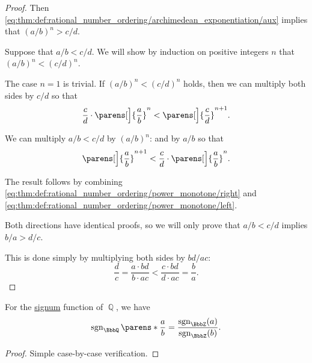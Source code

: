 \begin{proof}
  Then \eqref{eq:thm:def:rational_number_ordering/archimedean_exponentiation/aux} implies that \( (a / b)^n > c / d \).

   Suppose that \( a / b < c / d \). We will show by induction on positive integers \( n \) that \( (a / b)^n < (c / d)^n \).

  The case \( n = 1 \) is trivial. If \( (a / b)^n < (c / d)^n \) holds, then we can multiply both sides by \( c / d \) so that
  \begin{equation}\label{eq:thm:def:rational_number_ordering/power_monotone/right}
    \frac c d \cdot \parens[\Big]{ \frac a b }^n < \parens[\Big]{ \frac c d }^{n+1}.
  \end{equation}

  We can multiply \( a / b < c / d \) by \( (a / b)^n \):
  and by \( a / b \) so that
  \begin{equation}\label{eq:thm:def:rational_number_ordering/power_monotone/left}
    \parens[\Big]{ \frac a b }^{n + 1} < \frac c d \cdot \parens[\Big]{ \frac a b }^n.
  \end{equation}

  The result follows by combining \eqref{eq:thm:def:rational_number_ordering/power_monotone/right} and \eqref{eq:thm:def:rational_number_ordering/power_monotone/left}.

   Both directions have identical proofs, so we will only prove that \( a / b < c / d \) implies \( b / a > d / c \).

  This is done simply by multiplying both sides by \( {bd} / {ac} \):
  \begin{equation*}
    \frac d c = \frac {a \cdot bd} {b \cdot ac} < \frac {c \cdot bd} {d \cdot ac} = \frac b a.
  \end{equation*}
\end{proof}

\begin{proposition}\label{thm:rational_number_signum}\mimprovised
  For the \hyperref[def:totally_ordered_ring_signum]{signum} function of \( \BbbQ \), we have
  \begin{equation*}
    \sgn_\BbbQ\parens*{ \frac a b } = \frac {\sgn_\BbbZ(a)} {\sgn_\BbbZ(b)}.
  \end{equation*}
\end{proposition}
\begin{proof}
  Simple case-by-case verification.
\end{proof}


